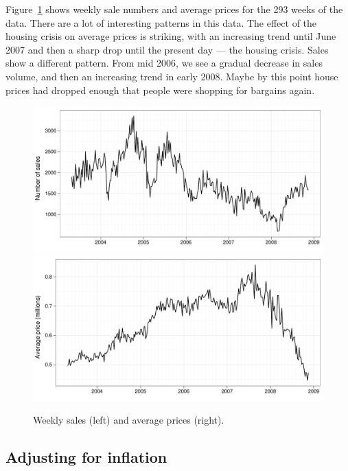 \documentclass[oneside]{article}
\begin{document}
Figure~\ref{fig:daily} shows weekly sale numbers and average prices for the 293 weeks of the data.  There are a lot of interesting patterns in this data.  The effect of the housing crisis on average prices is striking, with an increasing trend until June 2007 and then a sharp drop until the present day --- the housing crisis.  Sales show a different pattern.  From mid 2006, we see a gradual decrease in sales volume, and then an increasing trend in early 2008.  Maybe by this point house prices had dropped enough that people were shopping for bargains again.

\begin{figure}[htbp]
  \centering
    \includegraphics[width=0.5 \linewidth]{daily-sales}%
    \includegraphics[width=0.5 \linewidth]{daily-price}%
  \caption{Weekly sales (left) and average prices (right).}
  \label{fig:daily}
\end{figure}


\subsection{Adjusting for inflation}
\end{document}
